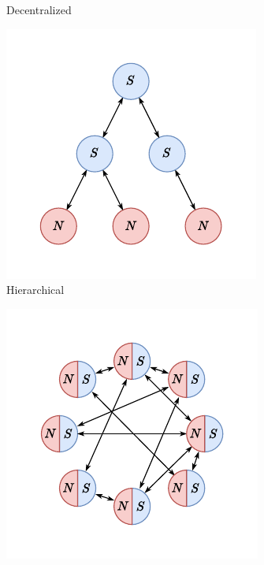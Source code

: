\begin{figure}
\begin{subfigure}{.25\textwidth}
    \caption{Decentralized}
    \label{fig:cids.decentralized}
  \end{subfigure}%
  \begin{subfigure}{.25\textwidth}
    \centering
    \includegraphics[width=\textwidth]{figures/topo-hierarchical}
    \caption{Hierarchical}
    \label{fig:cids.hierarchical}
  \end{subfigure}%
  \begin{subfigure}{.25\textwidth}
    \centering
    \includegraphics[width=\textwidth]{figures/topo-distributed}

\end{subfigure}
\end{figure}
